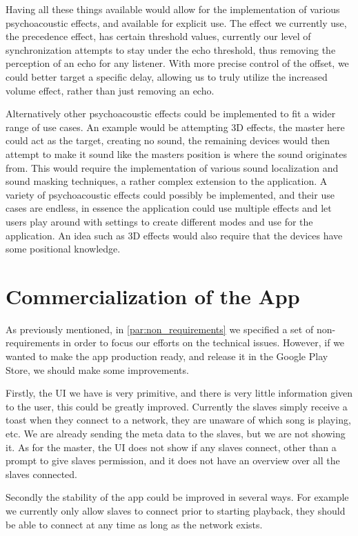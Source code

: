 Having all these things available would allow for the implementation of various psychoacoustic effects, and available for explicit use.
The effect we currently use, the precedence effect, has certain threshold values, currently our level of synchronization attempts to stay under the echo threshold, thus removing the perception of an echo for any listener.
With more precise control of the offset, we could better target a specific delay, allowing us to truly utilize the increased volume effect, rather than just removing an echo.

Alternatively other psychoacoustic effects could be implemented to fit a wider range of use cases.
An example would be attempting 3D effects, the master here could act as the target, creating no sound, the remaining devices would then attempt to make it sound like the masters position is where the sound originates from.
This would require the implementation of various sound localization and sound masking techniques, a rather complex extension to the application.
A variety of psychoacoustic effects could possibly be implemented, and their use cases are endless, in essence the application could use multiple effects and let users play around with settings to create different modes and use for the application.
An idea such as 3D effects would also require that the devices have some positional knowledge.

\section{Commercialization of the App}
As previously mentioned, in \cref{par:non_requirements} we specified a set of non-requirements in order to focus our efforts on the technical issues.
However, if we wanted to make the app production ready, and release it in the Google Play Store, we should make some improvements.

Firstly, the UI we have is very primitive, and there is very little information given to the user, this could be greatly improved.
Currently the slaves simply receive a toast when they connect to a network, they are unaware of which song is playing, etc.
We are already sending the meta data to the slaves, but we are not showing it.
As for the master, the UI does not show if any slaves connect, other than a prompt to give slaves permission, and it does not have an overview over all the slaves connected.

Secondly the stability of the app could be improved in several ways.
For example we currently only allow slaves to connect prior to starting playback, they should be able to connect at any time as long as the network exists.

